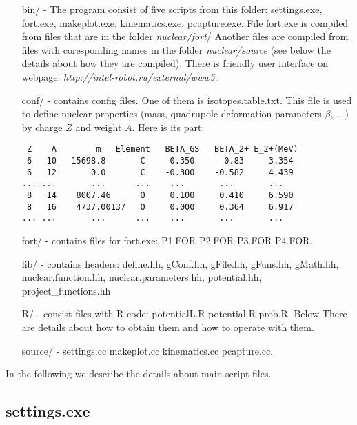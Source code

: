 \documentclass[preprint,review,12pt]{elsarticle}
\begin{document}
  \begin{itemize}
    \setlength\itemsep{0em}
    \item[bin/]    - The program consist of five scripts from this folder: settings.exe, fort.exe, makeplot.exe, kinematics.exe, pcapture.exe. File fort.exe is compiled from files that are in the folder \textit{nuclear/fort}/ Another files are compiled from files with coresponding names in the folder \textit{nuclear/source} (see below the details about how they are compiled). There is friendly user interface on webpage: \textit{http://intel-robot.ru/external/www5}.
    \item[conf/]   - contains config files. One of them is isotopes.table.txt. This file is used to define nuclear properties (mass, quadrupole deformation parameters $\beta$, .. ) by charge $Z$ and weight $A$. Here is its part:
\begin{verbatim}
 Z    A        m   Element   BETA_GS   BETA_2+ E_2+(MeV)
 6   10   15698.8       C    -0.350     -0.83     3.354
 6   12       0.0       C    -0.300    -0.582     4.439
... ...       ...      ...    ...       ...       ...
 8   14    8007.46      O     0.100     0.410     6.590
 8   16    4737.00137   O     0.000     0.364     6.917
... ...       ...      ...    ...       ...       ...
\end{verbatim}
    \item[fort/]   - contains files for fort.exe: P1.FOR P2.FOR P3.FOR P4.FOR. 
    \item[lib/]    - contains headers: define.hh, gConf.hh, gFile.hh, gFuns.hh, gMath.hh, nuclear.function.hh, nuclear.parameters.hh, potential.hh, project\_functions.hh
    \item[R/]      - consist files with R-code: potentialL.R  potential.R  prob.R. Below There are details about how to obtain them and how to operate with them.
    \item[source/] - settings.cc makeplot.cc  kinematics.cc pcapture.cc.   
  \end{itemize}
 
 In the following we describe the details about main script files.

  \subsection{settings.exe}
  \label{sec:settings}
\end{document}
